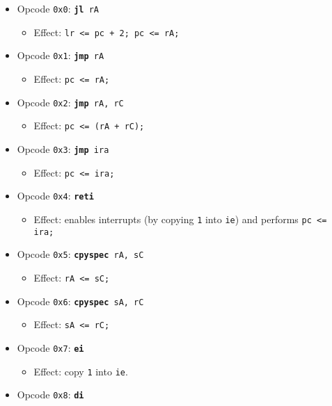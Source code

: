 \documentclass{article}
\begin{document}
	\singlespacing
	\begin{itemize}
		\item Opcode \texttt{0x0}:
			\texttt{\textbf{jl} rA}
		\begin{itemize}
			\item Effect:  \texttt{lr <= pc + 2; pc <= rA;}
		\end{itemize}
		\item Opcode \texttt{0x1}:
			\texttt{\textbf{jmp} rA}
		\begin{itemize}
			\item Effect:  \texttt{pc <= rA;}
		\end{itemize}
		\item Opcode \texttt{0x2}:
			\texttt{\textbf{jmp} rA, rC}
		\begin{itemize}
			\item Effect:  \texttt{pc <= (rA + rC);}
		\end{itemize}
		\item Opcode \texttt{0x3}:
			\texttt{\textbf{jmp} ira}
		\begin{itemize}
			\item Effect:  \texttt{pc <= ira;}
		\end{itemize}
		\item Opcode \texttt{0x4}:
			\texttt{\textbf{reti}}
		\begin{itemize}
			\item Effect:  enables interrupts (by copying \texttt{1} into
			\texttt{ie}) and performs \texttt{pc <= ira;}
		\end{itemize}
		\item Opcode \texttt{0x5}:
			\texttt{\textbf{cpyspec} rA, sC}
		\begin{itemize}
			\item Effect:  \texttt{rA <= sC;}
		\end{itemize}
		\item Opcode \texttt{0x6}:
			\texttt{\textbf{cpyspec} sA, rC}
		\begin{itemize}
			\item Effect:  \texttt{sA <= rC;}
		\end{itemize}
		\item Opcode \texttt{0x7}:
			\texttt{\textbf{ei}}
		\begin{itemize}
			\item Effect:  copy \texttt{1} into \texttt{ie}.
		\end{itemize}
		\item Opcode \texttt{0x8}:
			\texttt{\textbf{di}}
		\begin{itemize}

\end{itemize}
\end{itemize}
\end{document}
